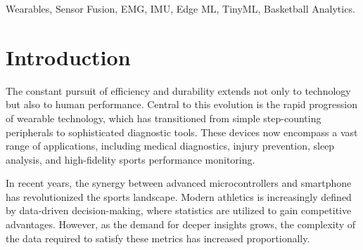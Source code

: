 \documentclass[conference]{IEEEtran}
\begin{document}
\begin{abstract}
Traditional sports wearables rely predominantly on kinematic data from Inertial Measurement Units (IMUs), lacking the physiological context required to classify complex movements and detect muscle fatigue. This 
paper presents a multi-modal wearable ecosystem designed for basketball analytics, fusing 9-axis IMU data with Electromyography (EMG) via a bilateral footwear prototype. The system utilizes a 
dual-tier architecture: a quantized TinyML neural network executing locally on an Android edge-computing hub for real-time inference, and a cloud-based Random Forest classifier for deep post-session analysis. 
Empirical evaluation demonstrates that EMG features, specifically Variance (VAR) and Root Mean Square (RMS), are the primary predictors for movement classification, outperforming traditional kinematics. During live testing, the localized 
TinyML model achieved 79.5\% accuracy, outperforming the cloud-tier model while eliminating network latency. Furthermore, a 500ms majority-voting smoothing algorithm increased classification stability by 6.4\%, 
providing a robust framework for real-time athletic monitoring and fatigue-based injury prevention.
\end{abstract}

\begin{IEEEkeywords}
Wearables, Sensor Fusion, EMG, IMU, Edge ML, TinyML, Basketball Analytics.
\end{IEEEkeywords}

\section{Introduction}

The constant pursuit of efficiency and durability extends not only to technology but also to human performance. Central to this 
evolution is the rapid progression of wearable technology, which has transitioned from simple step-counting peripherals to sophisticated diagnostic tools. These devices now 
encompass a vast range of applications, including medical diagnostics, injury prevention, sleep analysis, and high-fidelity sports performance monitoring.

In recent years, the synergy between advanced microcontrollers and smartphone has revolutionized the sports landscape. Modern athletics is increasingly defined by 
data-driven decision-making, where statistics are utilized to gain competitive advantages. However, as the demand for deeper insights grows, the complexity of the 
data required to satisfy these metrics has increased proportionally.
\end{document}
